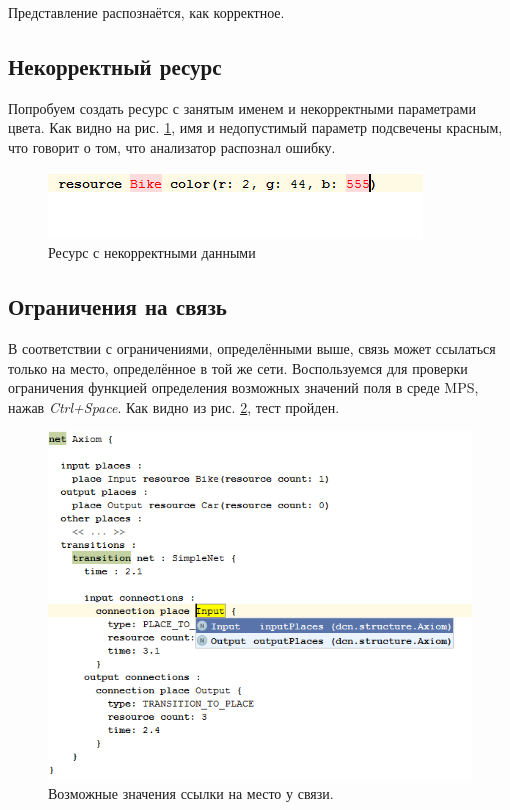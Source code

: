 		
		
		
		
		
		
		
		
		Представление распознаётся, как корректное.
		
		\subsection{Некорректный ресурс}
			Попробуем создать ресурс с занятым именем и некорректными параметрами цвета. Как видно на рис. \ref{fig:resource-test}, имя и недопустимый параметр подсвечены красным, что говорит о том, что анализатор распознал ошибку.
		
			\begin{figure}[th]
				\centering
				\includegraphics[width=0.7\linewidth]{images/test-project/resource}
				\caption{Ресурс с некорректными данными}
				\label{fig:resource-test}
			\end{figure}
	
		\subsection{Ограничения на связь}
			В соответствии с ограничениями, определёнными выше, связь может ссылаться только на место, определённое в той же сети. Воспользуемся для проверки ограничения функцией определения возможных значений поля в среде MPS, нажав \textit{Ctrl+Space}. Как видно из рис. \ref{fig:connection-test}, тест пройден.
			
			\begin{figure}[th]
				\centering
				\includegraphics[width=0.7\linewidth]{images/test-project/connection}
				\caption{Возможные значения ссылки на место у связи.}
				\label{fig:connection-test}
			\end{figure}
	
